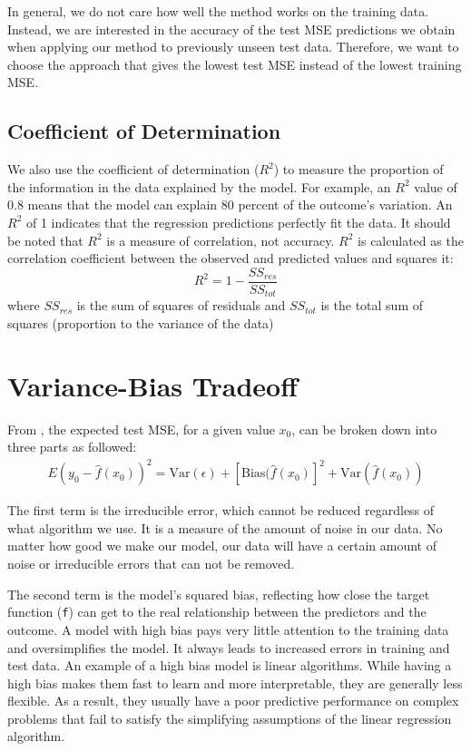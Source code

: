 In general, we do not care how well the method works  on the training
data. Instead, we are interested in the accuracy of the test MSE predictions we
obtain when applying our method to previously unseen test data. Therefore, we
want to choose the approach that gives the lowest test MSE instead of the lowest
training MSE.

\subsection{Coefficient of Determination}
We also use the coefficient of determination ($R^2$) to measure the proportion
of the information in the data explained by the model.  For example, an $R^2$
value of 0.8 means that the model can explain  80 percent of the outcome's
variation. An $R^2$ of 1 indicates that the regression predictions perfectly fit
the data. It should be noted that $R^2$ is a measure of correlation, not
accuracy.
$R^2$ is calculated as the correlation coefficient between the
observed and predicted values and squares it:
\[ R^2 = 1 - \frac{SS_{res}}{SS_{tot}}\]
where $SS_{res}$ is the sum of squares of residuals and $SS_{tot}$ is the total
sum of squares (proportion to the variance of the data)

\section{Variance-Bias Tradeoff}

From \cite{james2013introduction}, the expected test MSE, for a given value $x_0$, can be broken down into three
parts as followed:
\begin{eqnarray}
E(y_0 - \hat{f}(x_{0}))^2 =  \textrm{Var}(\epsilon) +
[\textrm{Bias}(\hat{f}(x_{0})]^2 + \textrm{Var}(\hat{f}(x_{0}))
\label{eqn:variance-bias-tradeoff}
\end{eqnarray}

The first term is the irreducible error, which cannot be reduced regardless of
what algorithm we use. It is a measure of the amount of noise in our data. No
matter how good we make our model, our data will have a certain amount of noise
or irreducible errors that can not be removed.

The second term is the model's squared bias, reflecting how close the target
function (\texttt{f}) can get to the real relationship between the predictors
and the outcome.  A model with high bias pays very little attention to the
training data and oversimplifies the model. It always leads to increased errors
in training and test data.  An example of a high bias model is linear
algorithms. While having a high bias makes them fast to learn and more
interpretable, they are generally less flexible.  As a result, they usually have
a poor predictive performance on complex problems that fail to satisfy the
simplifying assumptions of the linear regression algorithm.

